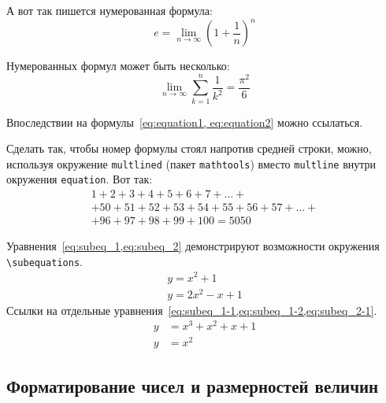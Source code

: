 А вот так пишется нумерованная формула:
\begin{equation}
    \label{eq:equation1}
    e = \lim_{n \to \infty} \left( 1+\frac{1}{n} \right) ^n
\end{equation}

Нумерованных формул может быть несколько:
\begin{equation}
    \label{eq:equation2}
    \lim_{n \to \infty} \sum_{k=1}^n \frac{1}{k^2} = \frac{\pi^2}{6}
\end{equation}

Впоследствии на формулы~\cref{eq:equation1, eq:equation2} можно ссылаться.

Сделать так, чтобы номер формулы стоял напротив средней строки, можно,
используя окружение \verb|multlined| (пакет \verb|mathtools|) вместо
\verb|multline| внутри окружения \verb|equation|. Вот так:
\begin{equation} %
    \label{eq:equation3}
    \begin{multlined}
        1+ 2+3+4+5+6+7+\dots + \\
        + 50+51+52+53+54+55+56+57 + \dots + \\
        + 96+97+98+99+100=5050
    \end{multlined}
\end{equation}

Уравнения~\cref{eq:subeq_1,eq:subeq_2} демонстрируют возможности
окружения \verb|\subequations|.
\begin{subequations}
    \label{eq:subeq_1}
    \begin{gather}
        y = x^2 + 1 \label{eq:subeq_1-1} \\
        y = 2 x^2 - x + 1 \label{eq:subeq_1-2}
    \end{gather}
\end{subequations}
Ссылки на отдельные уравнения~\cref{eq:subeq_1-1,eq:subeq_1-2,eq:subeq_2-1}.
\begin{subequations}
    \label{eq:subeq_2}
    \begin{align}
        y &= x^3 + x^2 + x + 1 \label{eq:subeq_2-1} \\
        y &= x^2
    \end{align}
\end{subequations}

\subsection{Форматирование чисел и размерностей величин}\label{sec:units}

